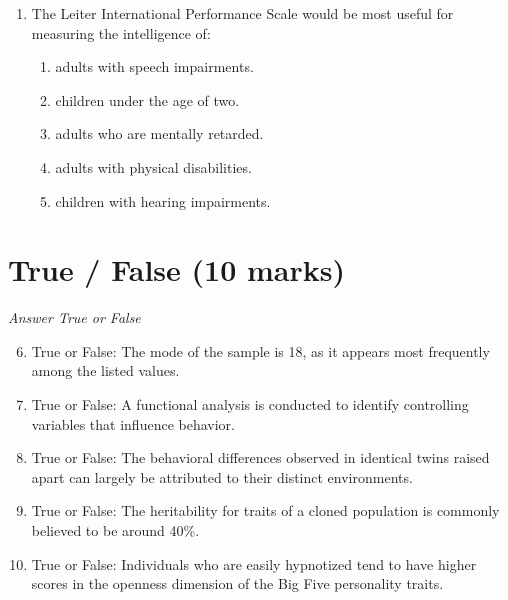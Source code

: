 \documentclass[12pt]{article}
\begin{document}
\begin{enumerate}[label=\arabic*.]
\begin{enumerate}[label=(\alph*)]
    \item Social media usage, internet browsing habits, television viewing preferences
    \item Intelligence, memory, reaction time
    \item Speech patterns, tone of voice, cadence
    \item Happiness, sadness, anger
\end{enumerate}
\item The Leiter International Performance Scale would be most useful for measuring the intelligence of:
\begin{enumerate}[label=(\alph*)]
    \item adults with speech impairments.
    \item children under the age of two.
    \item adults who are mentally retarded.
    \item adults with physical disabilities.
    \item children with hearing impairments.
\end{enumerate}
\end{enumerate}

\section*{True / False (10 marks)}
\textit{Answer True or False}
\begin{enumerate}[label=\arabic*.]
\setcounter{enumi}{5}
\item True or False: The mode of the sample is 18, as it appears most frequently among the listed values.
\item True or False: A functional analysis is conducted to identify controlling variables that influence behavior.
\item True or False: The behavioral differences observed in identical twins raised apart can largely be attributed to their distinct environments.
\item True or False: The heritability for traits of a cloned population is commonly believed to be around 40\%.
\item True or False: Individuals who are easily hypnotized tend to have higher scores in the openness dimension of the Big Five personality traits.
\end{enumerate}
\end{document}
